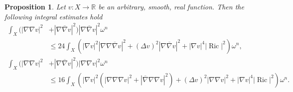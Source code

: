 \documentclass[12pt]{article}
\newtheorem{proposition}[theorem]{Proposition}
\numberwithin{equation}{section}
\newcommand{\R}{\mathbb{R}}
\DeclareMathOperator{\Ric}{Ric}
\newcommand{\oo}[1]{\overline{#1}}
\begin{document}
\begin{proposition}
Let $v: X \to \R$ be an arbitrary, smooth, real function. Then the following integral estimates hold
\begin{align*}
     \int_X (|\nabla \nabla v|^2 &+ |\nabla \oo{\nabla} v|^2)|\nabla \oo{\nabla} v|^2 \omega^n\\ 
     &\leq 24 \int_X (|\nabla v|^2 |\nabla \nabla \oo{\nabla} v|^2 + (\Delta v)^2 |\nabla \oo{\nabla} v|^2 +|\nabla v|^4 |\Ric|^2) \omega^n,\\
    \int_X (|\nabla \nabla v|^2 &+ |\nabla \oo{\nabla} v|^2)|\nabla \nabla v|^2 \omega^n\\
    &\leq 16\int_X (|\nabla v|^2 (|\nabla \nabla \nabla v|^2 + |\oo{\nabla} \nabla \nabla v|^2) + (\Delta v)^2 |\nabla \nabla v|^2 + |\nabla v|^4|\Ric|^2)\omega^n.
\end{align*}
\end{proposition}
\end{document}
